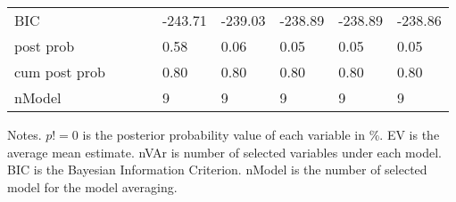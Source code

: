 \documentclass[12pt, english]{article}
\begin{document}
\begin{table}[H]
{\begin{tabular}{@{}lllllllll@{}}
                BIC                         &        &         &        & -243.71 & -239.03 & -238.89 & -238.89 & -238.86 \\
                post prob                   &        &         &        & 0.58    & 0.06    & 0.05    & 0.05    & 0.05    \\
                cum post prob               &        &         &        & 0.80    & 0.80    & 0.80    & 0.80    & 0.80    \\
                nModel                      &        &         &        & 9       & 9       & 9       & 9       & 9       \\ \bottomrule
            \end{tabular}%
        }
        \begin{minipage}{19cm}
            \vspace{0.1cm}
            \small Notes. $p!=0$ is the posterior probability value of each variable in \%. EV is the average mean estimate. nVAr is number of selected variables under each model. BIC is the Bayesian Information Criterion. nModel is the number of selected model for the model averaging.
        \end{minipage}
    \end{table}
\end{document}
